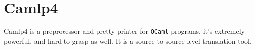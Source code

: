 
\chapter{Camlp4}
\label{sec:camlp4}
Camlp4 is a preprocessor and pretty-printer for \verb|OCaml| programs,
it's extremely powerful, and hard to grasp as well. It is a
source-to-source level translation tool.


% 
% 





% 
% 
% 
% 
  
% 
% 
% 

% 
% 
% 
% 
% 


